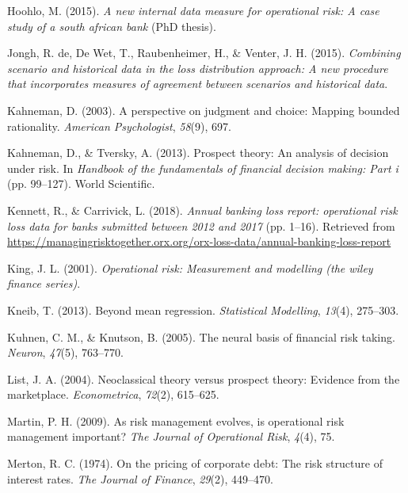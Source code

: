 \documentclass{DissertateUSU}
\begin{document}
\leavevmode\hypertarget{ref-hoohlo2015new}{}%
Hoohlo, M. (2015). \emph{A new internal data measure for operational
risk: A case study of a south african bank} (PhD thesis).

\leavevmode\hypertarget{ref-de2015combining}{}%
Jongh, R. de, De Wet, T., Raubenheimer, H., \& Venter, J. H. (2015).
\emph{Combining scenario and historical data in the loss distribution
approach: A new procedure that incorporates measures of agreement
between scenarios and historical data}.

\leavevmode\hypertarget{ref-kahneman2003perspective}{}%
Kahneman, D. (2003). A perspective on judgment and choice: Mapping
bounded rationality. \emph{American Psychologist}, \emph{58}(9), 697.

\leavevmode\hypertarget{ref-kahneman2013prospect}{}%
Kahneman, D., \& Tversky, A. (2013). Prospect theory: An analysis of
decision under risk. In \emph{Handbook of the fundamentals of financial
decision making: Part i} (pp. 99--127). World Scientific.

\leavevmode\hypertarget{ref-orxablr2018}{}%
Kennett, R., \& Carrivick, L. (2018). \emph{Annual banking loss report:
operational risk loss data for banks submitted between 2012 and 2017}
(pp. 1--16). Retrieved from
\url{https://managingrisktogether.orx.org/orx-loss-data/annual-banking-loss-report}

\leavevmode\hypertarget{ref-king2001operational}{}%
King, J. L. (2001). \emph{Operational risk: Measurement and modelling
(the wiley finance series)}.

\leavevmode\hypertarget{ref-kneib2013beyond}{}%
Kneib, T. (2013). Beyond mean regression. \emph{Statistical Modelling},
\emph{13}(4), 275--303.

\leavevmode\hypertarget{ref-kuhnen2005neural}{}%
Kuhnen, C. M., \& Knutson, B. (2005). The neural basis of financial risk
taking. \emph{Neuron}, \emph{47}(5), 763--770.

\leavevmode\hypertarget{ref-list2004neoclassical}{}%
List, J. A. (2004). Neoclassical theory versus prospect theory: Evidence
from the marketplace. \emph{Econometrica}, \emph{72}(2), 615--625.

\leavevmode\hypertarget{ref-martin2009risk}{}%
Martin, P. H. (2009). As risk management evolves, is operational risk
management important? \emph{The Journal of Operational Risk},
\emph{4}(4), 75.

\leavevmode\hypertarget{ref-merton1974pricing}{}%
Merton, R. C. (1974). On the pricing of corporate debt: The risk
structure of interest rates. \emph{The Journal of Finance},
\emph{29}(2), 449--470.
\end{document}
